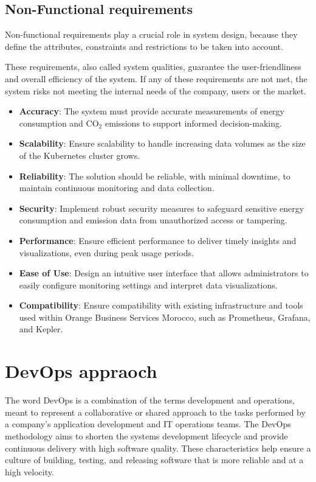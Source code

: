 \subsection{Non-Functional requirements}

Non-functional requirements play a crucial role in system design,
because they define the attributes, constraints and restrictions to be taken into account.

These requirements, also called system qualities, guarantee the
user-friendliness and overall efficiency of the system. If any of these requirements are not met,
the system risks not meeting the internal needs of the company, users
or the market.

\begin{itemize}
  \item \textbf{Accuracy}: The system must provide accurate measurements of energy consumption and CO$_2$ emissions to support informed decision-making.
  \item \textbf{Scalability}: Ensure scalability to handle increasing data volumes as the size of the Kubernetes cluster grows.
  \item \textbf{Reliability}: The solution should be reliable, with minimal downtime, to maintain continuous monitoring and data collection.
  \item \textbf{Security}: Implement robust security measures to safeguard sensitive energy consumption and emission data from unauthorized access or tampering.
  \item \textbf{Performance}: Ensure efficient performance to deliver timely insights and visualizations, even during peak usage periods.
  \item \textbf{Ease of Use}: Design an intuitive user interface that allows administrators to easily configure monitoring settings and interpret data visualizations.
  \item \textbf{Compatibility}: Ensure compatibility with existing infrastructure and tools used within Orange Business Services Morocco, such as Prometheus, Grafana, and Kepler.
\end{itemize}


\section{DevOps appraoch}
The word DevOps is a combination of the terms development and operations, meant to represent a collaborative or shared approach to the tasks performed by a company's application development and IT operations teams.
The DevOps methodology aims to shorten the systems development lifecycle and provide continuous delivery with high software quality. These characteristics help ensure a culture of building, testing, and releasing software that is more reliable and at a high velocity.

